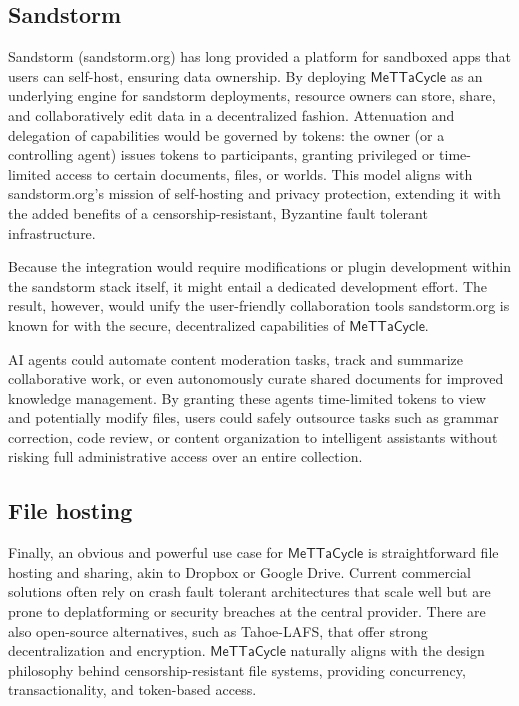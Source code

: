 \documentclass{article}
\newcommand{\MC}{\mathsf{MeTTaCycle}}
\begin{document}
\subsection{Sandstorm}

Sandstorm (sandstorm.org) has long provided a platform for sandboxed
apps that users can self-host, ensuring data ownership. By deploying
$\MC$ as an underlying engine for sandstorm deployments, resource
owners can store, share, and collaboratively edit data in a
decentralized fashion. Attenuation and delegation of capabilities
would be governed by tokens: the owner (or a controlling agent) issues
tokens to participants, granting privileged or time-limited access to
certain documents, files, or worlds. This model aligns with
sandstorm.org’s mission of self-hosting and privacy protection,
extending it with the added benefits of a censorship-resistant,
Byzantine fault tolerant infrastructure.

Because the integration would require modifications or plugin
development within the sandstorm stack itself, it might entail a
dedicated development effort. The result, however, would unify the
user-friendly collaboration tools sandstorm.org is known for with the
secure, decentralized capabilities of $\MC$.

AI agents could automate content moderation tasks, track and summarize
collaborative work, or even autonomously curate shared documents for
improved knowledge management. By granting these agents time-limited
tokens to view and potentially modify files, users could safely
outsource tasks such as grammar correction, code review, or content
organization to intelligent assistants without risking full
administrative access over an entire collection.

\subsection{File hosting}

Finally, an obvious and powerful use case for $\MC$ is straightforward
file hosting and sharing, akin to Dropbox or Google Drive. Current
commercial solutions often rely on crash fault tolerant architectures
that scale well but are prone to deplatforming or security breaches at
the central provider. There are also open-source alternatives, such as
Tahoe-LAFS, that offer strong decentralization and encryption. $\MC$
naturally aligns with the design philosophy behind
censorship-resistant file systems, providing concurrency,
transactionality, and token-based access.
\end{document}

